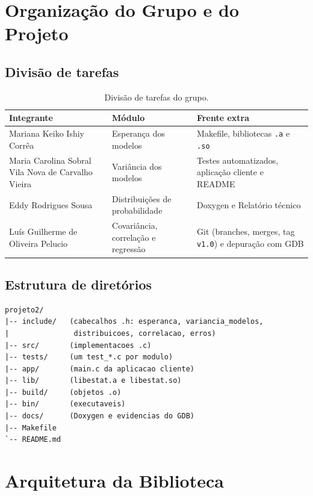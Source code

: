 \documentclass[12pt,a4paper]{article}
\newcommand{\cod}[1]{\texttt{#1}}
\begin{document}
\section{Organização do Grupo e do Projeto}

\subsection{Divisão de tarefas}
\begin{table}[h]
\centering
\begin{tabular}{@{}p{4.2cm}p{4.2cm}p{6cm}@{}}
\toprule
Integrante & Módulo & Frente extra \\
\midrule
Mariana Keiko Ishiy Corrêa & Esperança dos modelos & Makefile, bibliotecas \cod{.a} e \cod{.so} \\

Maria Carolina Sobral Vila Nova de Carvalho Vieira & Variância dos modelos & Testes automatizados, aplicação cliente e README  \\
Eddy Rodrigues Sousa & Distribuições de probabilidade & Doxygen e Relatório técnico \\
Luís Guilherme de Oliveira Pelucio & Covariância, correlação e regressão & Git (branches, merges, tag \cod{v1.0}) e depuração com GDB \\
\bottomrule
\end{tabular}
\caption{Divisão de tarefas do grupo.}
\end{table}

\subsection{Estrutura de diretórios}
\begin{lstlisting}[style=shell]
projeto2/
|-- include/   (cabecalhos .h: esperanca, variancia_modelos,
|               distribuicoes, correlacao, erros)
|-- src/       (implementacoes .c)
|-- tests/     (um test_*.c por modulo)
|-- app/       (main.c da aplicacao cliente)
|-- lib/       (libestat.a e libestat.so)
|-- build/     (objetos .o)
|-- bin/       (executaveis)
|-- docs/      (Doxygen e evidencias do GDB)
|-- Makefile
`-- README.md
\end{lstlisting}

\section{Arquitetura da Biblioteca}
\end{document}
